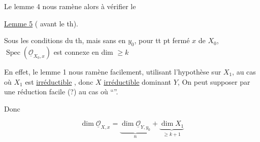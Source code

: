 
Le lemme 4 nous ramène alors à vérifier le

\uline{Lemme 5} ( avant le th).

Sous les conditions du th, mais sans   en $y_0$,  pour tt pt fermé $x$ de $X_0$,  $\operatorname{Spec}(\underline{\mathcal O}_{X_0,x})$ est connexe en dim $\geq k$

En effet, le lemme 1  nous ramène facilement, utilisant l'hypothèse sur $X_1$, au cas où $X_1$ est \uline{irréductible} , donc $X$ \uline{irréductible} dominant $Y$,  On peut supposer par une réduction facile (?) au cas où ``''.

Donc

\[
\dim\underline{\mathcal O}_{X,x}=\underbrace{\dim\underline{\mathcal O}_{Y,y_0}}_{n}+\underbrace{\dim X_1}_{\geq k+1}
\]

